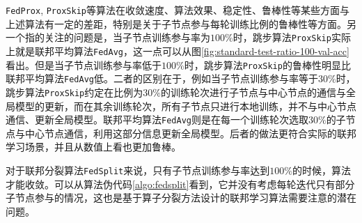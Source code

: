 \texttt{FedProx}, \texttt{ProxSkip}等算法在收敛速度、算法效果、稳定性、鲁棒性等某些方面与上述算法有一定的差距，特别是关于子节点参与每轮训练比例的鲁棒性等方面。另一个指的关注的问题是，当子节点训练参与率为$100\%$时，跳步算法\texttt{ProxSkip}实际上就是联邦平均算法\texttt{FedAvg}，这一点可以从图\ref{fig:standard-test-ratio-100-val-acc}看出。但是当子节点训练参与率低于$100\%$时，跳步算法\texttt{ProxSkip}的鲁棒性明显比联邦平均算法\texttt{FedAvg}低。二者的区别在于，例如当子节点训练参与率等于$30\%$时，跳步算法\texttt{ProxSkip}约定在比例为$30\%$的训练轮次进行子节点与中心节点的通信与全局模型的更新，而在其余训练轮次，所有子节点只进行本地训练，并不与中心节点通信、更新全局模型。联邦平均算法\texttt{FedAvg}则是在每一个训练轮次选取$30\%$的子节点与中心节点通信，利用这部分信息更新全局模型。后者的做法更符合实际的联邦学习场景，并且从数值上看也更加鲁棒。

对于联邦分裂算法\texttt{FedSplit}来说，只有子节点训练参与率达到$100\%$的时候，算法才能收敛。可以从算法伪代码\ref{algo:fedsplit}看到，它并没有考虑每轮迭代只有部分子节点参与的情况，这也是基于算子分裂方法设计的联邦学习算法需要注意的潜在问题。
